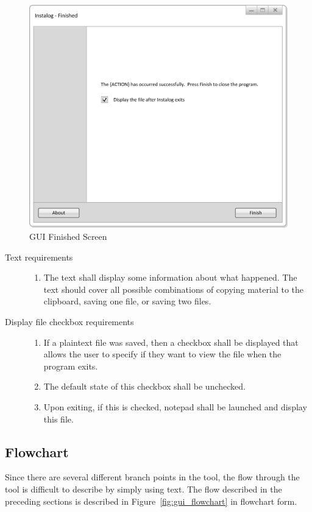 \begin{figure}[h]
  	\centering
	\includegraphics{figures/gui/Finished.png}
  	\caption{GUI Finished Screen}
  	\label{fig:gui_finished}
\end{figure}

\begin{description}
\item[Text requirements] \hfill
\begin{enumerate}
  \item The text shall display some information about what happened.  The text
  should cover all possible combinations of copying material to the clipboard,
  saving one file, or saving two files.
\end{enumerate}
\item[Display file checkbox requirements] \hfill
\begin{enumerate}
  \item If a plaintext file was saved, then a checkbox shall be displayed that
  allows the user to specify if they want to view the file when the program
  exits.
  \item The default state of this checkbox shall be unchecked.
  \item Upon exiting, if this is checked, notepad shall be launched and display
  this file.
\end{enumerate}
\end{description}

\subsection{Flowchart}
Since there are several different branch points in the tool, the flow through
the tool is difficult to describe by simply using text.  The flow described in
the preceding sections is described in Figure~\ref{fig:gui_flowchart} in
flowchart form.

